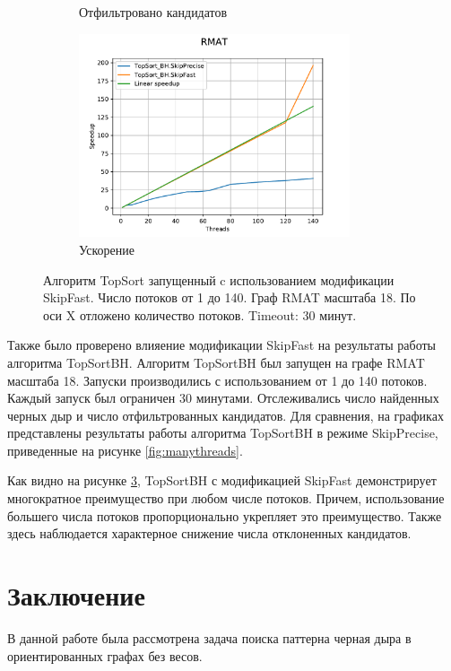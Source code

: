 \documentclass[12pt,a4paper,oneside,openany]{article}
\theoremstyle{definition}
\theoremstyle{lemma}
\theoremstyle{remark}
\begin{document}
\begin{figure}[H]
\begin{subfigure}{.5\textwidth}
      \caption{Отфильтровано кандидатов}
      \label{fig:fastskipmanythreads:filtered}
    \end{subfigure}
    \begin{subfigure}{.5\textwidth}
      \centering
      \includegraphics[width=8cm]{images/8_filtered_speedup.pdf}
      \caption{Ускорение}
      \label{fig:fastskipmanythreads:filteredspeedup}
    \end{subfigure}
    \caption{Алгоритм TopSort запущенный c использованием модификации SkipFast. Число потоков от 1 до 140. Граф RMAT масштаба 18. По оси X отложено количество потоков. Timeout: 30 минут.}
    \label{fig:fastskipmanythreads}
\end{figure}

Также было проверено влияение модификации SkipFast на результаты работы алгоритма
TopSortBH. Алгоритм TopSortBH был запущен на графе RMAT масштаба 18.
Запуски производились с использованием от 1 до 140 потоков. Каждый запуск был ограничен
30 минутами. Отслеживались число найденных черных дыр и число отфильтрованных кандидатов. Для сравнения,
на графиках представлены результаты работы алгоритма TopSortBH в режиме SkipPrecise,
приведенные на рисунке \ref{fig:manythreads}.

Как видно на рисунке \ref{fig:fastskipmanythreads}, TopSortBH с модификацией SkipFast
демонстрирует многократное преимущество при любом числе потоков. Причем, использование большего числа
потоков пропорционально укрепляет это преимущество. Также здесь наблюдается характерное
снижение числа отклоненных кандидатов.

\cleardoublepage
\section{Заключение}\label{sec:conclusion}
В данной работе была рассмотрена задача поиска паттерна черная дыра
в ориентированных графах без весов.

\end{document}

